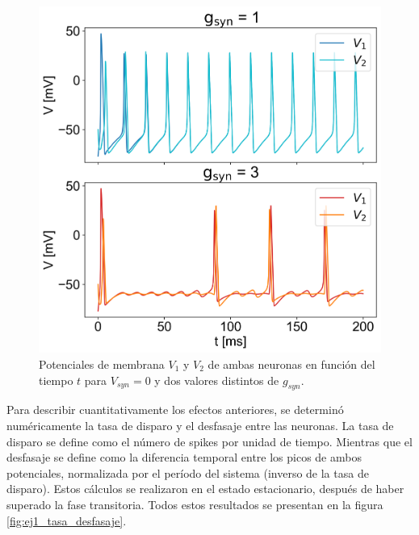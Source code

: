 \documentclass[aps,prb,twocolumn,superscriptaddress,floatfix,longbibliography]{revtex4-2}
\newcounter{para}
\begin{document}
\begin{figure}[h]
    \includegraphics[clip=true,width=\columnwidth]{ej1_potenciales_vs_gsyn.png}
    \caption{Potenciales de membrana $V_1$ y $V_2$ de ambas neuronas en función del tiempo $t$ para $V_{syn} = 0$ y dos valores distintos de $g_{syn}$.}
     \label{fig:ej1_potenciales_vs_gsyn}
\end{figure}

Para describir cuantitativamente los efectos anteriores, se determinó numéricamente la tasa de disparo y el desfasaje entre las neuronas. La tasa de disparo se define como el número de spikes por unidad de tiempo. Mientras que el desfasaje se define como la diferencia temporal entre los picos de ambos potenciales, normalizada por el período del sistema (inverso de la tasa de disparo). Estos cálculos se realizaron en el estado estacionario, después de haber superado la fase transitoria. Todos estos resultados se presentan en la figura \ref{fig:ej1_tasa_desfasaje}.
\end{document}
